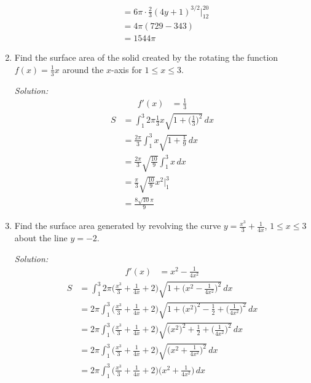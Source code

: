 \documentclass[16pt]{article}
\theoremstyle{remark}
\begin{document}
\begin{enumerate}
\begin{mdframed}[style=TheoremFrame]
\begin{align*}
&= 6\pi \cdot \frac{2}{3} (4y+1)^{3/2} \bigg|_{12}^{20}\\[1.5ex]
&= 4\pi (729-343)\\[1.5ex]
&= 1544\pi
\end{align*}
\end{mdframed}
\newpage
\item Find the surface area of the solid created by the rotating the function $f(x) = \frac{1}{3}x$ around the $x$-axis for $1 \leq x \leq 3$.
\begin{mdframed}[style=TheoremFrame]
\textit{Solution:}
\begin{align*}
f'(x) &= \frac{1}{3}
\end{align*}
\begin{align*}
S &= \int_1^3 2 \pi \frac{1}{3} x \sqrt{1+\bigg(\frac{1}{3}\bigg)^2} \, dx\\[1.5ex]
&= \frac{2\pi}{3} \int_1^3 x \sqrt{1 + \frac{1}{9}} \, dx\\[1.5ex]
&= \frac{2\pi}{3} \sqrt{\frac{10}{9}} \int_1^3 x \, dx\\[1.5ex]
&= \frac{\pi}{3} \sqrt{\frac{10}{9}} x^2 \bigg|_1^3\\[1.5ex]
&= \frac{8\sqrt{10}\pi}{9}
\end{align*}
\end{mdframed}
\newpage
\item Find the surface area generated by revolving the curve $\displaystyle{y=\frac{x^3}{3}+\frac{1}{4x}}$, $1\leq x \leq 3$ about the line $y=-2$.
\begin{mdframed}[style=TheoremFrame]
\textit{Solution:}
\begin{align*}
f'(x) &= x^2-\frac{1}{4x^2}
\end{align*}
\begin{align*}
S&= \int_1^3 2\pi \bigg(\frac{x^3}{3}+\frac{1}{4x}+2 \bigg) \sqrt{1 + \bigg(x^2-\frac{1}{4x^2}\bigg)^2} \, dx\\[1.5ex]
&= 2\pi \int_1^3 \bigg(\frac{x^3}{3}+\frac{1}{4x} +2\bigg) \sqrt{1 + \big(x^2\big)^2-\frac{1}{2}+\bigg(\frac{1}{4x^2}\bigg)^2} \, dx\\[1.5ex]
&= 2\pi \int_1^3 \bigg(\frac{x^3}{3}+\frac{1}{4x} +2\bigg) \sqrt{\big(x^2\big)^2+\frac{1}{2}+\bigg(\frac{1}{4x^2}\bigg)^2} \, dx\\[1.5ex]
&= 2\pi \int_1^3 \bigg(\frac{x^3}{3}+\frac{1}{4x} +2\bigg) \sqrt{\bigg(x^2+\frac{1}{4x^2}\bigg)^2} \, dx\\[1.5ex]
&= 2\pi \int_1^3 \bigg(\frac{x^3}{3}+\frac{1}{4x} +2\bigg) \bigg(x^2+\frac{1}{4x^2}\bigg) \, dx\\[1.5ex]

\end{align*}
\end{mdframed}
\end{enumerate}
\end{document}
